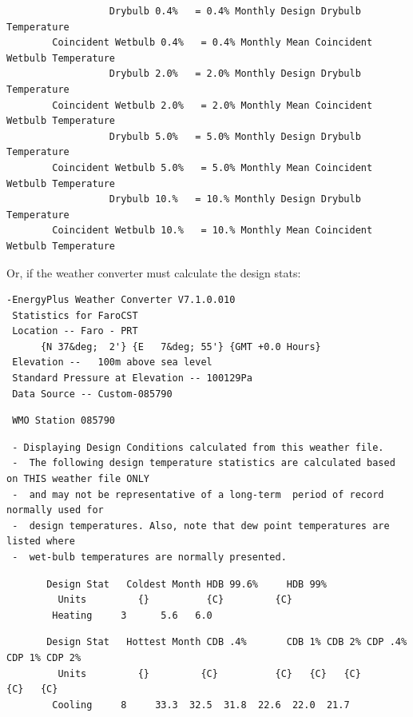 \begin{lstlisting}
                  Drybulb 0.4%   = 0.4% Monthly Design Drybulb Temperature
        Coincident Wetbulb 0.4%   = 0.4% Monthly Mean Coincident Wetbulb Temperature
                  Drybulb 2.0%   = 2.0% Monthly Design Drybulb Temperature
        Coincident Wetbulb 2.0%   = 2.0% Monthly Mean Coincident Wetbulb Temperature
                  Drybulb 5.0%   = 5.0% Monthly Design Drybulb Temperature
        Coincident Wetbulb 5.0%   = 5.0% Monthly Mean Coincident Wetbulb Temperature
                  Drybulb 10.%   = 10.% Monthly Design Drybulb Temperature
        Coincident Wetbulb 10.%   = 10.% Monthly Mean Coincident Wetbulb Temperature
\end{lstlisting}

Or, if the weather converter must calculate the design stats:

\begin{lstlisting}
-EnergyPlus Weather Converter V7.1.0.010
 Statistics for FaroCST
 Location -- Faro - PRT 
      {N 37&deg;  2'} {E   7&deg; 55'} {GMT +0.0 Hours}
 Elevation --   100m above sea level
 Standard Pressure at Elevation -- 100129Pa
 Data Source -- Custom-085790
\end{lstlisting}

\begin{lstlisting}
 WMO Station 085790
\end{lstlisting}

\begin{lstlisting}
 - Displaying Design Conditions calculated from this weather file.
 -  The following design temperature statistics are calculated based on THIS weather file ONLY
 -  and may not be representative of a long-term  period of record normally used for
 -  design temperatures. Also, note that dew point temperatures are listed where
 -  wet-bulb temperatures are normally presented.
\end{lstlisting}

\begin{lstlisting}
       Design Stat   Coldest Month HDB 99.6%     HDB 99%
         Units         {}          {C}         {C} 
        Heating     3      5.6   6.0
\end{lstlisting}

\begin{lstlisting}
       Design Stat   Hottest Month CDB .4%       CDB 1% CDB 2% CDP .4%       CDP 1% CDP 2%
         Units         {}         {C}          {C}   {C}   {C}          {C}   {C}
        Cooling     8     33.3  32.5  31.8  22.6  22.0  21.7
\end{lstlisting}

